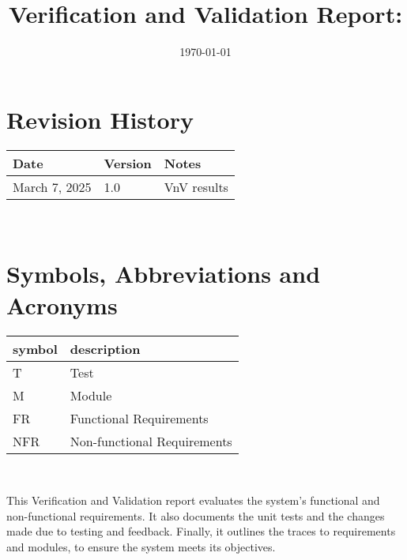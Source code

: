\documentclass[12pt, titlepage]{article}
\begin{document}
\title{Verification and Validation Report: \progname} 
\author{\authname}
\date{\today}
	
\maketitle


\section{Revision History}

\begin{tabularx}{\textwidth}{p{3cm}p{2cm}X}
\toprule {\bf Date} & {\bf Version} & {\bf Notes}\\
\midrule
March 7, 2025 & 1.0 & VnV results\\
\bottomrule
\end{tabularx}

~\newpage

\section{Symbols, Abbreviations and Acronyms}

\renewcommand{\arraystretch}{1.2}
\begin{tabular}{l l} 
  \toprule		
  \textbf{symbol} & \textbf{description}\\
  \midrule 
  T & Test\\
  M & Module\\
  FR & Functional Requirements\\
  NFR & Non-functional Requirements\\
  \bottomrule
\end{tabular}\\

\newpage

\tableofcontents

\listoftables %

\listoffigures %

\newpage


This Verification and Validation report evaluates the system's functional and non-functional requirements. It also documents the unit tests and the changes made due to testing and feedback. Finally, it outlines the traces to requirements and modules, to ensure the system meets its objectives.
\end{document}

